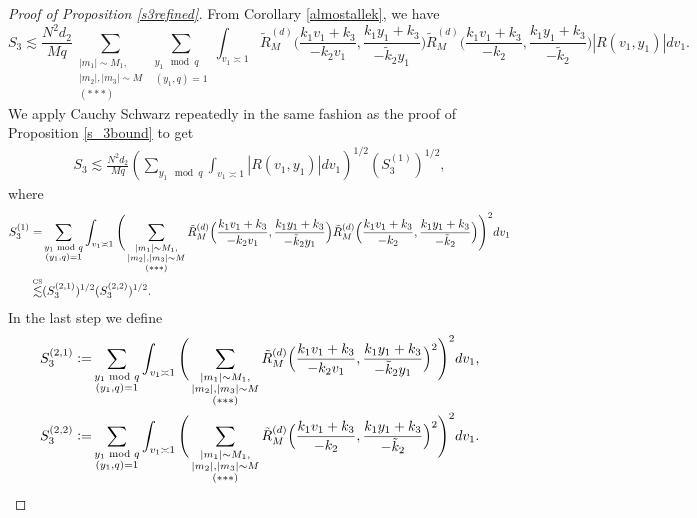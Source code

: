 \begin{proof}[Proof of Proposition \ref{s3refined}]
    From Corollary \ref{almostallek}, we have
    \[
    S_3\lesssim \frac{N^2d_2}{Mq} \sum_{\substack{|m_1|\sim M_1,\\|m_2|,|m_3|\sim M\\
        (***)}}\sum_{\substack{y_1\mod q\\ (y_1,q)=1} }\int_{v_1\asymp 1}
        \tilde{R}_M^{(d)}\Big(\frac{k_1v_1+k_3}{-k_2v_1},\frac{k_1y_1+k_3}{-\tilde{k}_2y_1}\Big)\tilde{R}_M^{(d)}\Big(\frac{k_1v_1+k_3}{-k_2},\frac{k_1y_1+k_3}{-\tilde{k}_2}\Big)|R\left(v_1,y_1\right)| dv_1.
    \]
    We apply Cauchy Schwarz repeatedly in the same fashion as the proof of Proposition \ref{s_3bound} to get \begin{align*}
        S_3\lesssim \frac{N^2d_2}{Mq} (\sum_{y_1\mod q}\int_{v_1\asymp 1}|R\left(v_1,y_1\right)| dv_1)^{1/2} (S_3^{(1)})^{1/2},
    \end{align*}
    where \begin{align*}
        S_3^{(1)}=&\sum_{\substack{y_1\mod q\\ (y_1,q)=1} }\int_{v_1\asymp 1}\Bigg(\sum_{\substack{|m_1|\sim M_1,\\|m_2|,|m_3|\sim M\\
        (***)}}
        \tilde{R}_M^{(d)}\Big(\frac{k_1v_1+k_3}{-k_2v_1},\frac{k_1y_1+k_3}{-\tilde{k}_2y_1}\Big)\tilde{R}_M^{(d)}\Big(\frac{k_1v_1+k_3}{-k_2},\frac{k_1y_1+k_3}{-\tilde{k}_2}\Big)\Bigg)^2 dv_1\\
        \stackon{CS}{\lesssim}& ( S_3^{(2,1)} )^{1/2}( S_3^{(2,2)} )^{1/2}.
    \end{align*}
    In the last step we define \begin{align*}
        S_3^{(2,1)}\defeq&\sum_{\substack{y_1\mod q\\ (y_1,q)=1} }\int_{v_1\asymp 1}\Bigg(\sum_{\substack{|m_1|\sim M_1,\\|m_2|,|m_3|\sim M\\
        (***)}}
        \tilde{R}_M^{(d)}\Big(\frac{k_1v_1+k_3}{-k_2v_1},\frac{k_1y_1+k_3}{-\tilde{k}_2y_1}\Big)^2\Bigg)^2 dv_1,
        \\
        S_3^{(2,2)}\defeq&\sum_{\substack{y_1\mod q\\ (y_1,q)=1} }\int_{v_1\asymp 1}\Bigg(\sum_{\substack{|m_1|\sim M_1,\\|m_2|,|m_3|\sim M\\
        (***)}}
       \tilde{R}_M^{(d)}\Big(\frac{k_1v_1+k_3}{-k_2},\frac{k_1y_1+k_3}{-\tilde{k}_2}\Big)^2\Bigg)^2 dv_1.

\end{align*}
\end{proof}
